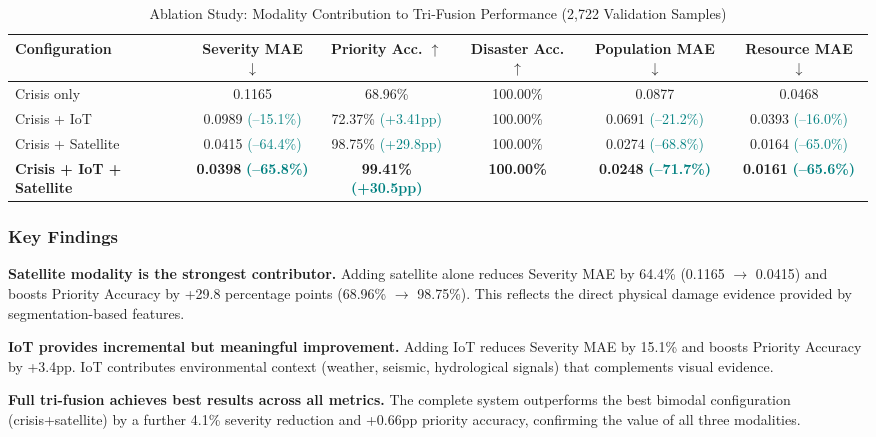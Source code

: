 \documentclass[journal]{IEEEtran}
\begin{document}
\begin{table}[!t]
\centering
\caption{Ablation Study: Modality Contribution to Tri-Fusion Performance (2,722 Validation Samples)}
\label{tab:ablation}
\begin{tabular}{lccccc}
\toprule
\textbf{Configuration} & \textbf{Severity MAE} $\downarrow$ & \textbf{Priority Acc.} $\uparrow$ & \textbf{Disaster Acc.} $\uparrow$ & \textbf{Population MAE} $\downarrow$ & \textbf{Resource MAE} $\downarrow$ \\
\midrule
Crisis only & 0.1165 & 68.96\% & 100.00\% & 0.0877 & 0.0468 \\
Crisis + IoT & 0.0989 \textcolor{teal}{\scriptsize(--15.1\%)} & 72.37\% \textcolor{teal}{\scriptsize(+3.41pp)} & 100.00\% & 0.0691 \textcolor{teal}{\scriptsize(--21.2\%)} & 0.0393 \textcolor{teal}{\scriptsize(--16.0\%)} \\
Crisis + Satellite & 0.0415 \textcolor{teal}{\scriptsize(--64.4\%)} & 98.75\% \textcolor{teal}{\scriptsize(+29.8pp)} & 100.00\% & 0.0274 \textcolor{teal}{\scriptsize(--68.8\%)} & 0.0164 \textcolor{teal}{\scriptsize(--65.0\%)} \\
\textbf{Crisis + IoT + Satellite} & \textbf{0.0398} \textcolor{teal}{\scriptsize\textbf{(--65.8\%)}} & \textbf{99.41\%} \textcolor{teal}{\scriptsize\textbf{(+30.5pp)}} & \textbf{100.00\%} & \textbf{0.0248} \textcolor{teal}{\scriptsize\textbf{(--71.7\%)}} & \textbf{0.0161} \textcolor{teal}{\scriptsize\textbf{(--65.6\%)}} \\
\bottomrule
\end{tabular}
\end{table}

\subsubsection{Key Findings}

\textbf{Satellite modality is the strongest contributor.} Adding satellite alone reduces Severity MAE by 64.4\% (0.1165 $\to$ 0.0415) and boosts Priority Accuracy by +29.8 percentage points (68.96\% $\to$ 98.75\%). This reflects the direct physical damage evidence provided by segmentation-based features.

\textbf{IoT provides incremental but meaningful improvement.} Adding IoT reduces Severity MAE by 15.1\% and boosts Priority Accuracy by +3.4pp. IoT contributes environmental context (weather, seismic, hydrological signals) that complements visual evidence.

\textbf{Full tri-fusion achieves best results across all metrics.} The complete system outperforms the best bimodal configuration (crisis+satellite) by a further 4.1\% severity reduction and +0.66pp priority accuracy, confirming the value of all three modalities.
\end{document}
